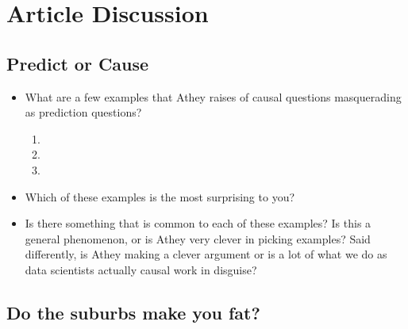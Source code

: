 \documentclass[
]{book}
\providecommand{\tightlist}{%
  \setlength{\itemsep}{0pt}\setlength{\parskip}{0pt}}
\begin{document}
\hypertarget{article-discussion}{%
\section{Article Discussion}\label{article-discussion}}

\hypertarget{predict-or-cause}{%
\subsection{Predict or Cause}\label{predict-or-cause}}

\begin{itemize}
\tightlist
\item
  What are a few examples that Athey raises of causal questions
  masquerading as prediction questions?

  \begin{enumerate}
  \def\labelenumi{\arabic{enumi}.}
  \tightlist
  \item
  \item
  \item
  \end{enumerate}
\item
  Which of these examples is the most surprising to you?
\item
  Is there something that is common to each of these examples? Is this a
  general phenomenon, or is Athey very clever in picking examples? Said
  differently, is Athey making a clever argument or is a lot of what we
  do as data scientists actually causal work in disguise?
\end{itemize}

\hypertarget{do-the-suburbs-make-you-fat}{%
\subsection{Do the suburbs make you
fat?}\label{do-the-suburbs-make-you-fat}}
\end{document}
